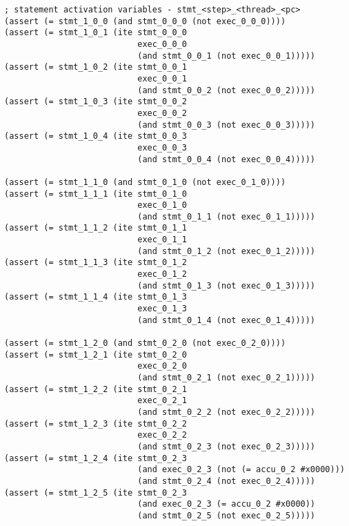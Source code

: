 \begin{lstlisting}[language=SMTLib]
; statement activation variables - stmt_<step>_<thread>_<pc>
(assert (= stmt_1_0_0 (and stmt_0_0_0 (not exec_0_0_0))))
(assert (= stmt_1_0_1 (ite stmt_0_0_0
                           exec_0_0_0
                           (and stmt_0_0_1 (not exec_0_0_1)))))
(assert (= stmt_1_0_2 (ite stmt_0_0_1
                           exec_0_0_1
                           (and stmt_0_0_2 (not exec_0_0_2)))))
(assert (= stmt_1_0_3 (ite stmt_0_0_2
                           exec_0_0_2
                           (and stmt_0_0_3 (not exec_0_0_3)))))
(assert (= stmt_1_0_4 (ite stmt_0_0_3
                           exec_0_0_3
                           (and stmt_0_0_4 (not exec_0_0_4)))))

(assert (= stmt_1_1_0 (and stmt_0_1_0 (not exec_0_1_0))))
(assert (= stmt_1_1_1 (ite stmt_0_1_0
                           exec_0_1_0
                           (and stmt_0_1_1 (not exec_0_1_1)))))
(assert (= stmt_1_1_2 (ite stmt_0_1_1
                           exec_0_1_1
                           (and stmt_0_1_2 (not exec_0_1_2)))))
(assert (= stmt_1_1_3 (ite stmt_0_1_2
                           exec_0_1_2
                           (and stmt_0_1_3 (not exec_0_1_3)))))
(assert (= stmt_1_1_4 (ite stmt_0_1_3
                           exec_0_1_3
                           (and stmt_0_1_4 (not exec_0_1_4)))))

(assert (= stmt_1_2_0 (and stmt_0_2_0 (not exec_0_2_0))))
(assert (= stmt_1_2_1 (ite stmt_0_2_0
                           exec_0_2_0
                           (and stmt_0_2_1 (not exec_0_2_1)))))
(assert (= stmt_1_2_2 (ite stmt_0_2_1
                           exec_0_2_1
                           (and stmt_0_2_2 (not exec_0_2_2)))))
(assert (= stmt_1_2_3 (ite stmt_0_2_2
                           exec_0_2_2
                           (and stmt_0_2_3 (not exec_0_2_3)))))
(assert (= stmt_1_2_4 (ite stmt_0_2_3
                           (and exec_0_2_3 (not (= accu_0_2 #x0000)))
                           (and stmt_0_2_4 (not exec_0_2_4)))))
(assert (= stmt_1_2_5 (ite stmt_0_2_3
                           (and exec_0_2_3 (= accu_0_2 #x0000))
                           (and stmt_0_2_5 (not exec_0_2_5)))))
\end{lstlisting}

\todo[inline]{} %


